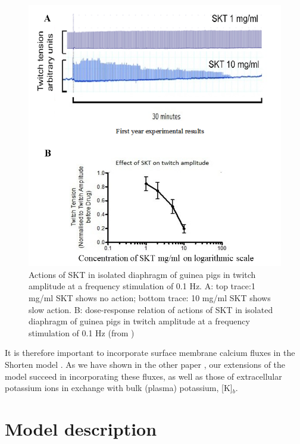 \documentclass[fleqn,10pt]{physiome}
\begin{document}
\begin{figure}[h!]
\centering
\includegraphics[width=0.65\linewidth]{figure01}
\caption{Actions of SKT in isolated diaphragm of guinea pigs in twitch amplitude at a frequency stimulation of 0.1 Hz.  
A: top trace:1 mg/ml SKT shows no action; bottom trace: 10 mg/ml SKT shows slow action.
B: dose-response relation of actions of SKT in isolated diaphragm of guinea pigs in twitch amplitude at a frequency stimulation of 0.1 Hz (from \citep{Sam2015Actions})}
\label{fig01}
\end{figure}
It is therefore important to incorporate surface membrane calcium fluxes in the Shorten model \citep{shorten2007mathematical}. As we have shown in the other paper \citep{Noble2019Incorporation}, our extensions of the model succeed in incorporating these fluxes, as well as those of extracellular potassium ions in exchange with bulk (plasma) potassium, [K]$_b$.

\section{Model description}
\end{document}
